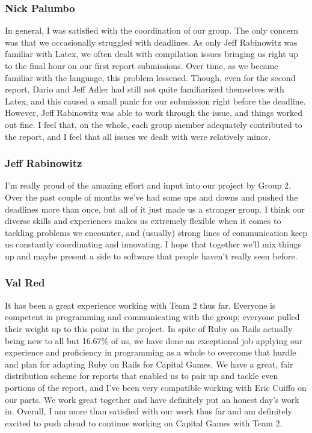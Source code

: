 \subsubsection{Nick Palumbo}
In general, I was satisfied with the coordination of our group. The only concern was that we occasionally struggled with deadlines. As only Jeff Rabinowitz was familiar with Latex, we often dealt with compilation issues bringing us right up to the final hour on our first report submissions. Over time, as we became familiar with the language, this problem lessened. Though, even for the second report, Dario and Jeff Adler had still not quite familiarized themselves with Latex, and this caused a small panic for our submission right before the deadline. However, Jeff Rabinowitz was able to work through the issue, and things worked out fine. I feel that, on the whole, each group member adequately contributed to the report, and I feel that all issues we dealt with were relatively minor.\\

\subsubsection{Jeff Rabinowitz}
I'm really proud of the amazing effort and input into our project by Group 2. Over the past couple of months we've had some ups and downs and pushed the deadlines more than once, but all of it just made us a stronger group. I think our diverse skills and experiences makes us extremely flexible when it comes to tackling problems we encounter, and (usually) strong lines of communication keep us constantly coordinating and innovating. I hope that together we'll mix things up and maybe present a side to software that people haven't really seen before. \\

\subsubsection{Val Red}
It has been a great experience working with Team 2 thus far. Everyone is competent in programming and communicating with the group; everyone pulled their weight up to this point in the project. In spite of Ruby on Rails actually being new to all but 16.67\% of us, we have done an exceptional job applying our experience and proficiency in programming as a whole to overcome that hurdle and plan for adapting Ruby on Rails for Capital Games. We have a great, fair distribution scheme for reports that enabled us to pair up and tackle even portions of the report, and I've been very compatible working with Eric Cuiffo on our parts. We work great together and have definitely put an honest day's work in. Overall, I am more than satisfied with our work thus far and am definitely excited to push ahead to continue working on Capital Games with Team 2.\\

